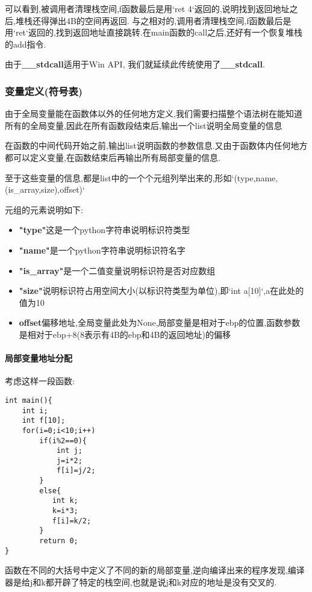 \documentclass{article}
\begin{document}
可以看到,被调用者清理栈空间,f函数最后是用`ret 4`返回的,说明找到返回地址之后,堆栈还得弹出4B的空间再返回.
与之相对的,调用者清理栈空间,f函数最后是用`ret`返回的,找到返回地址直接跳转.在main函数的call之后,还好有一个恢复堆栈的add指令.

由于\textbf{\_\_stdcall}适用于Win API, 我们就延续此传统使用了\textbf{\_\_stdcall}.

\subsubsection{变量定义(符号表)}

由于全局变量能在函数体以外的任何地方定义,我们需要扫描整个语法树在能知道所有的全局变量,因此在所有函数段结束后,输出一个list说明全局变量的信息


在函数的中间代码开始之前,输出list说明函数的参数信息.又由于函数体内任何地方都可以定义变量,在函数结束后再输出所有局部变量的信息.

至于这些变量的信息,都是list中的一个个元组列举出来的,形如`(type,name,(is\_array,size),offset)`

元组的元素说明如下:
\begin{itemize}
\item \textbf{"type"}这是一个python字符串说明标识符类型
\item \textbf{"name"}是一个python字符串说明标识符名字
\item \textbf{"is\_array"}是一个二值变量说明标识符是否对应数组
\item \textbf{"size"}说明标识符占用空间大小(以标识符类型为单位),即`int a[10]`,a在此处的值为10
\item \textbf{offset}偏移地址,全局变量此处为None,局部变量是相对于ebp的位置,函数参数是相对于ebp+8(8表示有4B的ebp和4B的返回地址)的偏移
\end{itemize}

\paragraph{局部变量地址分配}

考虑这样一段函数:

\begin{verbatim}
int main(){
    int i;
    int f[10];
    for(i=0;i<10;i++)
        if(i%2==0){
            int j;
            j=i*2;
            f[i]=j/2;
        }
        else{
           int k;
           k=i*3;
           f[i]=k/2;
        }
        return 0;
}
\end{verbatim}

函数在不同的大括号中定义了不同的新的局部变量,逆向编译出来的程序发现,编译器是给j和k都开辟了特定的栈空间,也就是说j和k对应的地址是没有交叉的.
\end{document}
